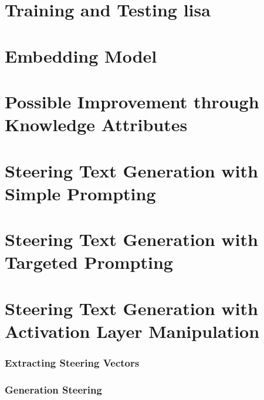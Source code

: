 \section{Training and Testing \acs{lisa}}
\label{sec:approach:lisa}


\section{Embedding Model}
\label{sec:approach:embedding}


\section{Possible Improvement through Knowledge Attributes}
\label{sec:approach:knowledge_attributes}


\section{Steering Text Generation with Simple Prompting}
\label{sec:approach:steering:simple}


\section{Steering Text Generation with Targeted Prompting}
\label{sec:approach:steering:targeted}


\section{Steering Text Generation with Activation Layer Manipulation}
\label{sec:approach:steering:actAdd}

\subsubsection{Extracting Steering Vectors}

\subsubsection{Generation Steering}